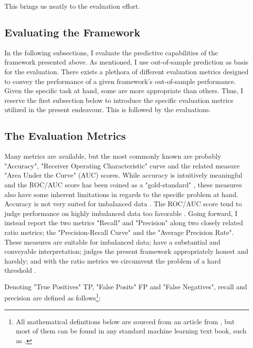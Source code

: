 \documentclass[a4paper]{article}
\begin{document}
This brings us neatly to the evaluation effort.\par

\subsection{Evaluating the Framework}
In the following subsections, I evaluate the predictive capabilities of the framework presented above. As mentioned, I use out-of-sample prediction as basis for the evaluation. There exists a plethora of different evaluation metrics designed to convey the performance of a given framework's out-of-sample performance. Given the specific task at hand, some are more appropriate than others. Thus, I reserve the first subsection below to introduce the specific evaluation metrics utilized in the present endeavour. This is followed by the evaluations.\par

\subsection{The Evaluation Metrics}

Many metrics are available, but the most commonly known are probably "Accuracy", "Receiver Operating Characteristic" curve and the related measure "Area Under the Curve" (AUC) scores. While accuracy is intuitively meaningful and the ROC/AUC score has been coined as a "gold-standard" \citep[366]{perry_2013}, these measures also have some inherent limitations in regards to the specific problem at hand. Accuracy is not very suited for imbalanced data \citep[1264]{He_2008}. The ROC/AUC score tend to judge performance on highly imbalanced data too favorable \citep[1278]{He_2008}. Going forward, I instead report the two metrics "Recall" and "Precision" along two closely related ratio metrics; the "Precision-Recall Curve" and the "Average Precision Rate". These measures are suitable for imbalanced data; have a substantial and conveyable interpretation; judges the present framework appropriately honest and harshly; and with the ratio metrics we circumvent the problem of a hard threshold \cite[1278]{He_2008}.

Denoting "True Positives" TP, "False Posits" FP and "False Negatives", recall and precision are defined as follows\footnote{All mathematical definitions below are sourced from an article from \cite{He_2008}, but most of them can be found in any standard machine learning text book, such as \cite{Friedman_2001}.}:
\end{document}
